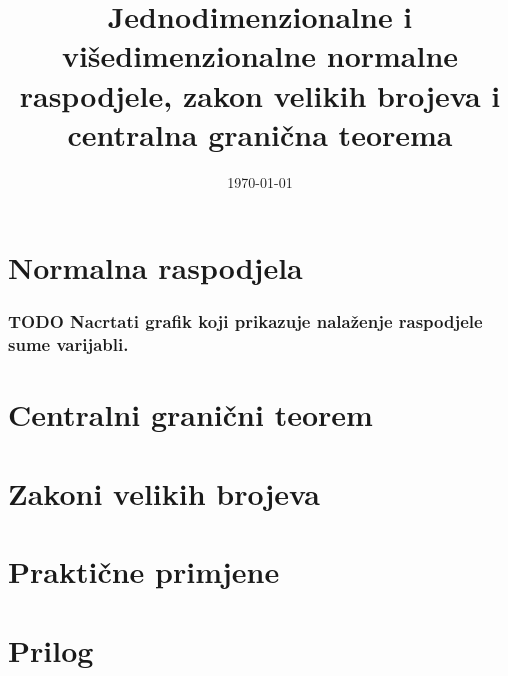 \documentclass[11pt]{article}
\date{\today}
\title{Jednodimenzionalne i višedimenzionalne normalne raspodjele, zakon velikih
brojeva i centralna granična teorema}
\begin{document}
\maketitle
\tableofcontents

\section{Normalna raspodjela}


\subsubsection{{\bfseries\sffamily TODO} Nacrtati grafik koji prikazuje nalaženje raspodjele sume varijabli.}

\section{Centralni granični teorem}


\section{Zakoni velikih brojeva}


\section{Praktične primjene}

\section{Prilog}

\end{document}
